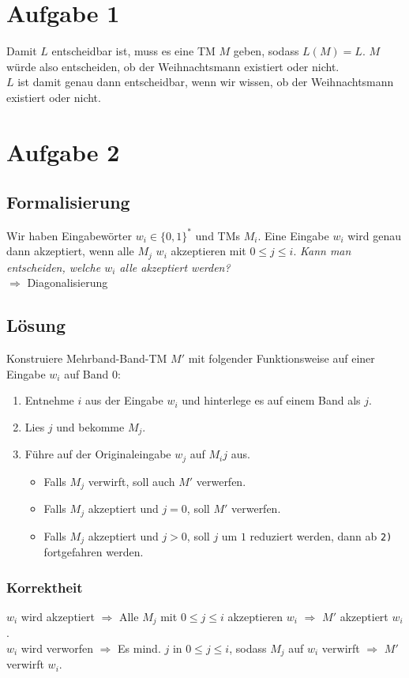 \documentclass[a4paper,11pt]{scrartcl}
\begin{document}
	\section*{Aufgabe 1}
	Damit $L$ entscheidbar ist, muss es eine TM $M$ geben, sodass $L(M) = L$. $M$ würde also entscheiden, ob der Weihnachtsmann existiert oder nicht.\\
	$L$ ist damit genau dann entscheidbar, wenn wir wissen, ob der Weihnachtsmann existiert oder nicht.
	
	
	\section*{Aufgabe 2}
	\subsection*{Formalisierung}
	Wir haben Eingabewörter $w_i \in \{0,1\}^*$ und TMs $M_i$.
	Eine Eingabe $w_i$ wird genau dann akzeptiert, wenn alle $M_j$ $w_i$ akzeptieren mit $0 \leq j \leq i$.
	\textit{Kann man entscheiden, welche $w_i$ alle akzeptiert werden?}\\
	$\Rightarrow$ Diagonalisierung
	
	\subsection*{Lösung}
	Konstruiere Mehrband-Band-TM $M'$ mit folgender Funktionsweise auf einer Eingabe $w_i$ auf Band 0:
	\begin{enumerate}
	\item	Entnehme $i$ aus der Eingabe $w_i$ und hinterlege es auf einem Band als $j$.
	\item	Lies $j$ und bekomme $M_j$.
	\item	Führe auf der Originaleingabe $w_j$ auf $M_ij$ aus.
		\begin{itemize}
		\item	Falls $M_j$ verwirft, soll auch $M'$ verwerfen.
		\item	Falls $M_j$ akzeptiert und $j=0$, soll $M'$ verwerfen.
		\item	Falls $M_j$ akzeptiert und $j>0$, soll $j$ um $1$ reduziert werden, dann ab \verb|2)| fortgefahren werden.
		\end{itemize}
	\end{enumerate}
	
	\subsubsection*{Korrektheit}
	$w_i$ wird akzeptiert $\Rightarrow$ Alle $M_j$ mit $0 \leq j \leq i$ akzeptieren $w_i$ $\Rightarrow$ $M'$ akzeptiert $w_i$.\\
	$w_i$ wird verworfen $\Rightarrow$ Es mind. $j$ in $0 \leq j \leq i$, sodass $M_j$ auf $w_i$ verwirft $\Rightarrow$ $M'$ verwirft $w_i$.
	
\end{document}
